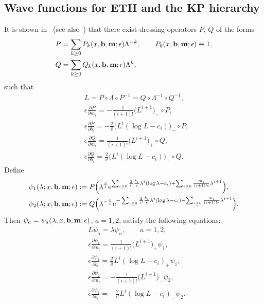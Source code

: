\documentclass[11pt]{article}
\numberwithin{equation}{section}
\newcommand{\e}{\epsilon}
\newcommand{\p}{\partial}
\newcommand{\nn}{\nonumber}
\numberwithin{equation}{section}
\begin{document}
\subsection{Wave functions for ETH and the KP hierarchy}
It is shown in~\cite{Carlet} (see also~\cite{CL, Milanov}) that there exist
dressing operators $P$, $Q$ of the forms
\begin{align}
&P= \sum_{k\ge0} P_k(x, {\bf b}, {\bf m};\e) \Lambda^{-k}, \qquad P_0(x, {\bf b}, {\bf m};\e)\equiv 1, \label{CoePk1005}\\
&Q= \sum_{k\ge0} Q_k(x, {\bf b}, {\bf m};\e) \Lambda^k, \label{CoeQk1005}
\end{align}
such that
\begin{align*}
& L=P\circ\Lambda\circ P^{-1}=Q\circ\Lambda^{-1}\circ Q^{-1}, \\
& \e\frac{\p P}{\p m_i} = - \frac1{(i+1)!} \bigl(L^{i+1}\bigr)_- \circ P, \\
& \e\frac{\p P}{\p b_i} = - \frac{2}{i!}\bigl(L^{i}(\log L-c_i)\bigr)_- \circ P,\\
& \e\frac{\p Q}{\p m_i} = \frac1{(i+1)!}\bigl(L^{i+1}\bigr)_+ \circ Q, \\
& \e\frac{\p Q}{\p b_i} = \frac{2}{i!}\bigl(L^{i}(\log L-c_i)\bigr)_+ \circ Q.
\end{align*}
Define
\begin{align*}
& \psi_1(\lambda; x, {\bf b}, {\bf m};\e) :=
P\Bigl(\lambda^{\frac{x}\e} {\rm e}^{\sum_{i\ge0} \frac{2}{i!} \frac{b_i}\e \lambda^i (\log \lambda-c_i)+\sum_{i\ge0} \frac{m_i}{(i+1)!\e} \lambda^{i+1}}\Bigr) , \\
& \psi_2(\lambda; x, {\bf b}, {\bf m};\e) := Q\Bigl(\lambda^{-\frac{x}\e}{\rm e}^{-\sum_{i\ge0} \frac{2}{i!} \frac{b_i}\e \lambda^i (\log \lambda-c_i)-\sum_{i\ge0} \frac{m_i}{(i+1)!\e} \lambda^{i+1}}\Bigr).
\end{align*}
Then $\psi_a=\psi_a(\lambda; x, {\bf b}, {\bf m};\e)$, $a=1,2$, satisfy the following equations:
\begin{align}
& L\psi_a = \lambda \psi_a, \qquad a=1,2, \label{Laxsp1005}\\
& \e \frac{\p \psi_1}{\p m_i} = \frac1{(i+1)!} \bigl(L^{i+1}\bigr)_+ \psi_1,\nn \\
& \e \frac{\p \psi_1}{\p b_i} = \frac{2}{i!} L^i(\log L - c_i)_+ \psi_1, \label{Laxa1bi} \\
& \e \frac{\p \psi_2}{\p m_i} = -\frac1{(i+1)!} \bigl(L^{i+1}\bigr)_- \psi_2,\nn \\
& \e \frac{\p \psi_2}{\p b_i} = -\frac{2}{i!} L^i(\log L - c_i)_- \psi_2. \label{Laxa2bi}
\end{align}
\end{document}
